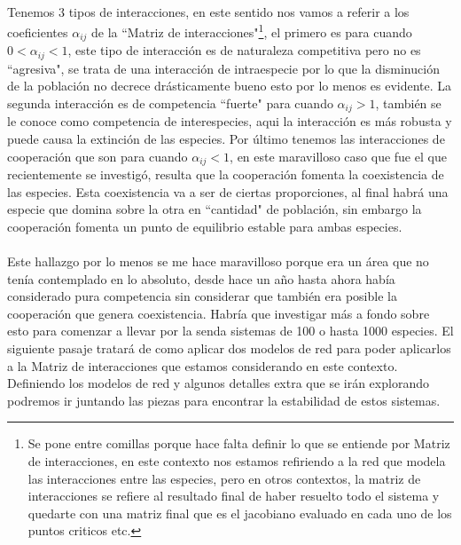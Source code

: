 \documentclass[11pt,a4paper]{article}
\begin{document}
\\
Tenemos 3 tipos de interacciones, en este sentido nos vamos a referir a los coeficientes $\alpha_{ij}$ de la ``Matriz de interacciones"\footnote{Se pone entre comillas porque hace falta definir lo que se entiende por Matriz de interacciones, en este contexto nos estamos refiriendo a la red que modela las interacciones entre las especies, pero en otros contextos, la matriz de interacciones se refiere al resultado final de haber resuelto todo el sistema y quedarte con una matriz final que es el jacobiano evaluado en cada uno de los puntos criticos etc.}, el primero es para cuando $0<\alpha_{ij}<1$, este tipo de interacción es de naturaleza competitiva pero no es ``agresiva", se trata de una interacción de intraespecie por lo que la disminución de la población no decrece drásticamente bueno esto por lo menos es evidente. La segunda interacción es de competencia ``fuerte" para cuando $\alpha_{ij}>1$, también se le conoce como competencia de interespecies, aqui la interacción es más robusta y puede causa la extinción de las especies. Por último tenemos las interacciones de cooperación que son para cuando $\alpha_{ij}<1$, en este maravilloso caso que fue el que recientemente se investigó, resulta que la cooperación fomenta la coexistencia de las especies. Esta coexistencia va a ser de ciertas proporciones, al final habrá una especie que domina sobre la otra en ``cantidad" de población, sin embargo la cooperación fomenta un punto de equilibrio estable para ambas especies.\\
\\
Este hallazgo por lo menos se me hace maravilloso porque era un área que no tenía contemplado en lo absoluto, desde hace un año hasta ahora había considerado pura competencia sin considerar que también era posible la cooperación que genera coexistencia. Habría que investigar más a fondo sobre esto para comenzar a llevar por la senda sistemas de 100 o hasta 1000 especies. El siguiente pasaje tratará de como aplicar dos modelos de red para poder aplicarlos a la Matriz de interacciones que estamos considerando en este contexto. Definiendo los modelos de red y algunos detalles extra que se irán explorando podremos ir juntando las piezas para encontrar la estabilidad de estos sistemas.
\end{document}
